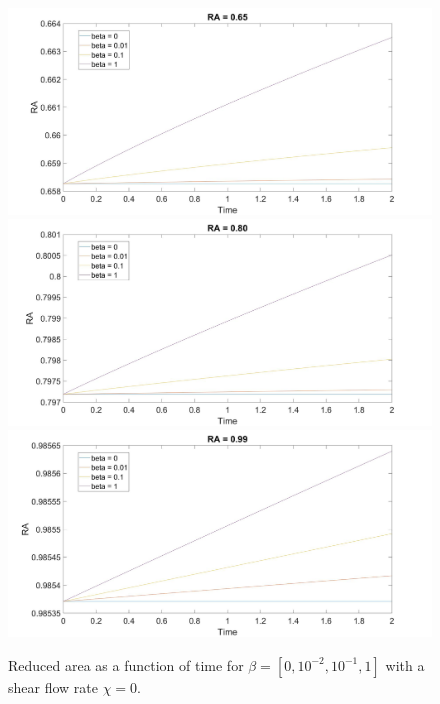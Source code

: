 \documentclass[aps,prl,showpacs]{revtex4}
\begin{document}
\begin{figure}
	\centering
	\includegraphics[width=.9\textwidth]{figures/1.jpg}
	\includegraphics[width=.9\textwidth]{figures/2.jpg}
	\includegraphics[width=.9\textwidth]{figures/3.jpg}
	\caption{Reduced area as a function of time for $\beta = [0, 10^{-2},10^{-1}, 1]$ with a shear flow rate $\chi = 0$.}
	\label{Shear0}
\end{figure}
\end{document}
